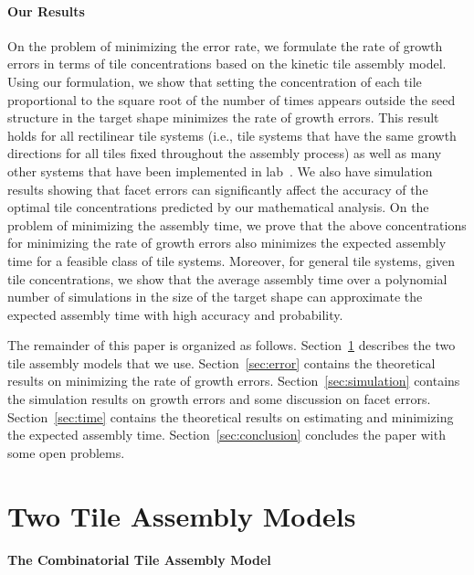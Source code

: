 \documentclass[11pt]{article}
\begin{document}
\paragraph{Our Results}
On the problem of minimizing the error rate, we formulate the rate of growth errors in terms of tile concentrations based on the kinetic tile assembly model. Using our formulation, we show that setting the concentration of each tile  proportional to the square root of the number of times  appears outside the seed structure in the target shape minimizes the rate of growth errors. This result holds for all rectilinear tile systems (i.e., tile systems that have the same growth directions for all tiles fixed throughout the assembly process) as well as many other systems that have been implemented in lab~\cite{sw05:zigzagexp,bsrw09:counter_origami}. We also have simulation results showing that facet errors can significantly affect the accuracy of the optimal tile concentrations predicted by our mathematical analysis. On the problem of minimizing the assembly time, we prove that the above concentrations for minimizing the rate of growth errors also minimizes the expected assembly time for a feasible class of tile systems. Moreover, for general tile systems, given tile concentrations, we show that the average assembly time over a polynomial number of simulations in the size of the target shape can approximate the expected assembly time with high accuracy and probability. 

The remainder of this paper is organized as follows. Section~\ref{sec:definition} describes the two tile assembly models that we use. Section~\ref{sec:error} contains the theoretical results on minimizing the rate of growth errors. Section~\ref{sec:simulation} contains the simulation results on growth errors and some discussion on facet errors. Section~\ref{sec:time} contains the theoretical results on estimating and minimizing the expected assembly time. Section~\ref{sec:conclusion} concludes the paper with some open problems. 



\section{Two Tile Assembly Models}
\label{sec:definition}

\paragraph{The Combinatorial Tile Assembly Model}
\end{document}
